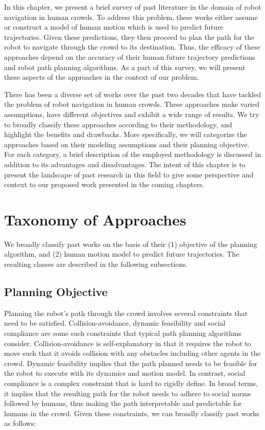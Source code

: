 In this chapter, we present a brief survey of past literature in the domain of robot navigation in human crowds. To address this problem, these works either assume or construct a model of human motion which is used to predict future trajectories. Given these predictions, they then proceed to plan the path for the robot to navigate through the crowd to its destination. Thus, the efficacy of these approaches depend on the accuracy of their human future trajectory predictions and robot path planning algorithms. As a part of this survey, we will present these aspects of the approaches in the context of our problem.

There has been a diverse set of works over the past two decades that have tackled the problem of robot navigation in human crowds. These approaches make varied assumptions, have different objectives and exhibit a wide range of results. We try to broadly classify these approaches according to their methodology, and highlight the benefits and drawbacks. More specifically, we will categorize the approaches based on their modeling assumptions and their planning objective. For each category, a brief description of the employed methodology is discussed in addition to its advantages and disadvantages. The intent of this chapter is to present the landscape of past research in this field to give some perspective and context to our proposed work presented in the coming chapters.

\section{Taxonomy of Approaches}
\label{sec:survey-taxonomy-approaches}

We broadly classify past works on the basis of their (1) objective of the planning algorithm, and (2) human motion model to predict future trajectories. The resulting classes are described in the following subsections.

\subsection{Planning Objective}
\label{sec:survey-planning-objective}
Planning the robot's path through the crowd involves several constraints that need to be satisfied. Collision-avoidance, dynamic feasibility and social compliance are some such constraints that typical path planning algorithms consider. Collision-avoidance is self-explanatory in that it requires the robot to move such that it avoids collision with any obstacles including other agents in the crowd. Dynamic feasibility implies that the path planned needs to be feasible for the robot to execute with its dynamics and motion model. In contrast, social compliance is a complex constraint that is hard to rigidly define. In broad terms, it implies that the resulting path for the robot needs to adhere to social norms followed by humans, thus making the path interpretable and predictable for humans in the crowd. Given these constraints, we can broadly classify past works as follows:

